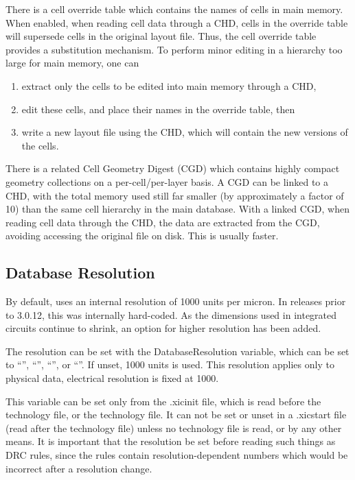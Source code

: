 There is a cell override table which contains the names of cells in
main memory.  When enabled, when reading cell data through a CHD,
cells in the override table will supersede cells in the original
layout file.  Thus, the cell override table provides a substitution
mechanism.  To perform minor editing in a hierarchy too large for main
memory, one can
\begin{enumerate}
\item{extract only the cells to be edited into main memory through a
CHD,}
\item{edit these cells, and place their names in the override
table, then}
\item{write a new layout file using the CHD, which will
contain the new versions of the cells.}
\end{enumerate}

There is a related Cell Geometry Digest (CGD) which contains highly
compact geometry collections on a per-cell/per-layer basis.  A CGD can
be linked to a CHD, with the total memory used still far smaller (by
approximately a factor of 10) than the same cell hierarchy in the main
database.  With a linked CGD, when reading cell data through the CHD,
the data are extracted from the CGD, avoiding accessing the original
file on disk.  This is usually faster.

\subsection{Database Resolution}

By default, {\Xic} uses an internal resolution of 1000 units per
micron.  In releases prior to 3.0.12, this was internally hard-coded. 
As the dimensions used in integrated circuits continue to shrink, an
option for higher resolution has been added.

The resolution can be set with the {\et DatabaseResolution} variable,
which can be set to ``{}'', ``{}'', ``{}'', or
``{}''.  If unset, 1000 units is used.  This resolution
applies only to physical data, electrical resolution is fixed at 1000.

This variable can be set only from the {\vt .xicinit} file, which is
read before the technology file, or the technology file.  It can not
be set or unset in a {\vt .xicstart} file (read after the technology
file) unless no technology file is read, or by any other means.  It is
important that the resolution be set before reading such things as DRC
rules, since the rules contain resolution-dependent numbers which
would be incorrect after a resolution change. 

